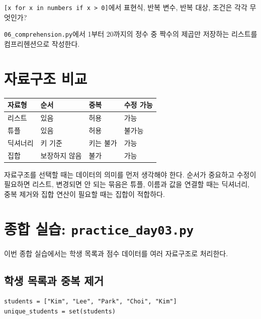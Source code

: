 \documentclass[11pt,a4paper]{article}
\begin{document}
\begin{checkpointbox}
\texttt{[x for x in numbers if x > 0]}에서 표현식, 반복 변수, 반복 대상, 조건은 각각 무엇인가?
\end{checkpointbox}

\begin{practicebox}
\texttt{06\_comprehension.py}에서 1부터 20까지의 정수 중 짝수의 제곱만 저장하는 리스트를 컴프리헨션으로 작성한다.
\end{practicebox}

\section{자료구조 비교}

\begin{center}
\begin{tabular}{llll}
\toprule
자료형 & 순서 & 중복 & 수정 가능 \\
\midrule
리스트 & 있음 & 허용 & 가능 \\
튜플 & 있음 & 허용 & 불가능 \\
딕셔너리 & 키 기준 & 키는 불가 & 가능 \\
집합 & 보장하지 않음 & 불가 & 가능 \\
\bottomrule
\end{tabular}
\end{center}

자료구조를 선택할 때는 데이터의 의미를 먼저 생각해야 한다. 순서가 중요하고 수정이 필요하면 리스트, 변경되면 안 되는 묶음은 튜플, 이름과 값을 연결할 때는 딕셔너리, 중복 제거와 집합 연산이 필요할 때는 집합이 적합하다.

\section{종합 실습: \texttt{practice\_day03.py}}

이번 종합 실습에서는 학생 목록과 점수 데이터를 여러 자료구조로 처리한다.

\subsection{학생 목록과 중복 제거}

\begin{lstlisting}
students = ["Kim", "Lee", "Park", "Choi", "Kim"]
unique_students = set(students)
\end{lstlisting}
\end{document}

